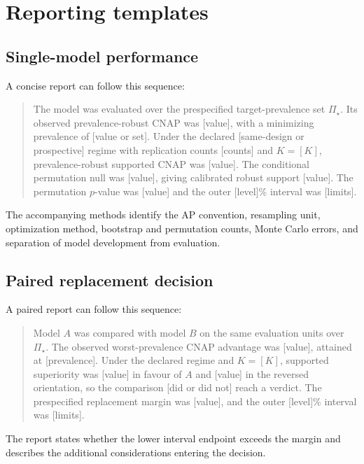 \documentclass[11pt]{article}
\newcommand{\PSet}{\Pi_\star}
\theoremstyle{remark}
\begin{document}
\section{Reporting templates}
\label{app:report-template}

\subsection{Single-model performance}

A concise report can follow this sequence:
\begin{quote}
The model was evaluated over the prespecified target-prevalence set $\PSet$. Its observed prevalence-robust CNAP was [value], with a minimizing prevalence of [value or set]. Under the declared [same-design or prospective] regime with replication counts [counts] and $K=[K]$, prevalence-robust supported CNAP was [value]. The conditional permutation null was [value], giving calibrated robust support [value]. The permutation $p$-value was [value] and the outer [level]\% interval was [limits].
\end{quote}
The accompanying methods identify the AP convention, resampling unit, optimization method, bootstrap and permutation counts, Monte Carlo errors, and separation of model development from evaluation.

\subsection{Paired replacement decision}

A paired report can follow this sequence:
\begin{quote}
Model $A$ was compared with model $B$ on the same evaluation units over $\PSet$. The observed worst-prevalence CNAP advantage was [value], attained at [prevalence]. Under the declared regime and $K=[K]$, supported superiority was [value] in favour of $A$ and [value] in the reversed orientation, so the comparison [did or did not] reach a verdict. The prespecified replacement margin was [value], and the outer [level]\% interval was [limits].
\end{quote}
The report states whether the lower interval endpoint exceeds the margin and describes the additional considerations entering the decision.
\end{document}
